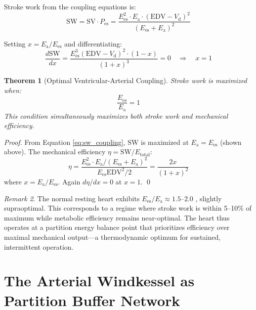\documentclass[10pt,twocolumn,a4paper]{article}
\newtheorem{theorem}{Theorem}[section]
\theoremstyle{remark}
\newtheorem{remark}[theorem]{Remark}
\newcommand{\Ees}{E_{\mathrm{es}}}
\newcommand{\Ea}{E_{\mathrm{a}}}
\newcommand{\Vd}{V_{\mathrm{d}}}
\newcommand{\Pes}{P_{\mathrm{es}}}
\newcommand{\SV}{\mathrm{SV}}
\newcommand{\EDV}{\mathrm{EDV}}
\newcommand{\SW}{\mathrm{SW}}
\begin{document}
Stroke work from the coupling equations is:
\begin{equation}
    \SW = \SV \cdot \Pes = \frac{\Ees^2 \cdot \Ea \cdot (\EDV - \Vd)^2}{(\Ees + \Ea)^2}
    \label{eq:sw_coupling}
\end{equation}

Setting $x = \Ea/\Ees$ and differentiating:
\begin{equation}
    \frac{d\SW}{dx} = \frac{\Ees^3(\EDV-\Vd)^2 \cdot (1-x)}{(1+x)^3} = 0 \quad\Rightarrow\quad x = 1
\end{equation}

\begin{theorem}[Optimal Ventricular-Arterial Coupling]
\label{thm:coupling}
    Stroke work is maximized when:
    \begin{equation}
        \boxed{\frac{\Ees}{\Ea} = 1}
        \label{eq:optimal_coupling}
    \end{equation}
    This condition simultaneously maximizes both stroke work and mechanical efficiency.
\end{theorem}

\begin{proof}
    From Equation \ref{eq:sw_coupling}, $\SW$ is maximized at $\Ea = \Ees$ (shown above). The mechanical efficiency $\eta = \SW / E_{\mathrm{total}}$:
    \begin{equation}
        \eta = \frac{\Ees^2 \cdot \Ea / (\Ees + \Ea)^2}{\Ees \EDV^2/2} = \frac{2 x}{(1+x)^2}
    \end{equation}
    where $x = \Ea/\Ees$. Again $d\eta/dx = 0$ at $x = 1$. \qed
\end{proof}

\begin{remark}
    The normal resting heart exhibits $\Ees/\Ea \approx 1.5$--$2.0$ \cite{sunagawa1985ventricular}, slightly supraoptimal. This corresponds to a regime where stroke work is within 5--10\% of maximum while metabolic efficiency remains near-optimal. The heart thus operates at a partition energy balance point that prioritizes efficiency over maximal mechanical output—a thermodynamic optimum for sustained, intermittent operation.
\end{remark}

\section{The Arterial Windkessel as Partition Buffer Network}
\label{sec:windkessel}
\end{document}
